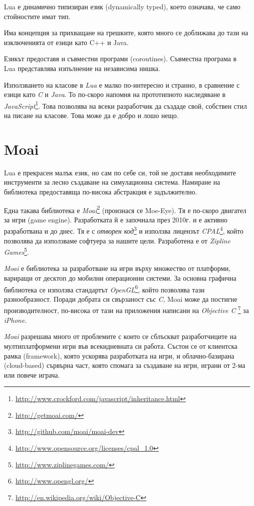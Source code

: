 			Lua е динамично типизиран език (dynamically typed), което означава, че само стойностите имат тип.			
			
			Има концепция за прихващане на грешките, която много се доближава до тази на изключенията от езици като
			C++ и Java.
			
			Езикът предоставя и съвместни програми (coroutines). Съвместна програма в Lua представлява изпълнение на независима нишка.		
			
			Използването на класове в \emph{Lua} е малко по-интересно и странно, в сравнение с езици като \emph{C} и \emph{Java}. 
			То по-скоро напомня на прототипното наследяване в
			\emph{JavaScript}\footnote{\url{http://www.crockford.com/javascript/inheritance.html}}.
			Това позволява на всеки разработчик да създаде свой, собствен стил на писане на класове. Това може да е добро и лошо нещо.			
	
	\section{Moai}
	
		Lua е прекрасен малък език, но сам по себе си, той не доставя необходимите инструменти
		за лесно създаване на симулационна система. Намиране на библиотека предоставяща по-висока
		абстракция е задължително.
		
		Една такава библиотека е \emph{Moai}\footnote{\url{http://getmoai.com/}} (произнася се Moe-Eye).
		Тя е по-скоро двигател за игри (game engine).
		Разработката й е започнала през 2010г. и е активно разработвана и до днес. 
		Тя е с \emph{отворен код}\footnote{\url{http://github.com/moai/moai-dev}}
		и използва лицензът \emph{CPAL}\footnote{\url{http://www.opensource.org/licenses/cpal_1.0}}, който
		позволява да използваме софтуера за нашите цели. 
		Разработена е от \emph{Zipline Games}\footnote{\url{http://www.ziplinegames.com/}}.						
		
		\emph{Moai} е библиотека за разработване на игри върху множество от платформи, вариращи от десктоп до
		мобилни операционни системи. За основна графична библиотека се използва стандартът 
		\emph{OpenGL}\footnote{\url{http://www.opengl.org/}}, който позволява тази разнообразност.
		Поради добрата си свързаност със \emph{C}, Moai може да постигне производителност, по-висока
		от тази на приложения написани на  \emph{Objective C}
		\footnote{\url{http://en.wikipedia.org/wiki/Objective-C}} за \emph{iPhone}.
		
		\emph{Moai} разрешава много от проблемите с които се сблъскват разработчиците на мултиплатформени 
		игри във всекидневната си работа. Състои се от клиентска рамка (framework), която ускорява разработката
		на игри, и облачно-базирана (cloud-based) сървърна част, която спомага за създаване на игри, играни от 2-ма
		или повече играча.

